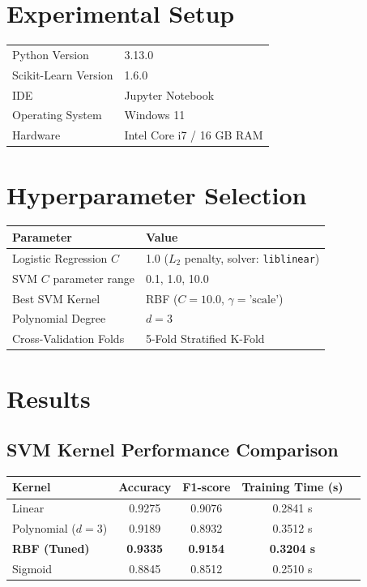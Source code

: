 \documentclass[12pt,a4paper]{article}
\begin{document}
\section{Experimental Setup}

\begin{tabular}{ll}
\toprule
Python Version & 3.13.0 \\
Scikit-Learn Version & 1.6.0 \\
IDE & Jupyter Notebook \\
Operating System & Windows 11 \\
Hardware & Intel Core i7 / 16 GB RAM \\
\bottomrule
\end{tabular}

\section{Hyperparameter Selection}

\begin{tabular}{ll}
\toprule
Parameter & Value\\
\midrule
Logistic Regression $C$ & 1.0 ($L_2$ penalty, solver: \texttt{liblinear}) \\
SVM $C$ parameter range & 0.1, 1.0, 10.0 \\
Best SVM Kernel & RBF ($C = 10.0$, $\gamma = \text{'scale'}$) \\
Polynomial Degree & $d = 3$ \\
Cross-Validation Folds & 5-Fold Stratified K-Fold \\
\bottomrule
\end{tabular}

\section{Results}

\subsection*{SVM Kernel Performance Comparison}
\begin{tabular}{lcccc}
\toprule
Kernel & Accuracy & F1-score & Training Time (s) \\
\midrule
Linear & 0.9275 & 0.9076 & 0.2841 s \\
Polynomial ($d=3$) & 0.9189 & 0.8932 & 0.3512 s \\
\textbf{RBF (Tuned)} & \textbf{0.9335} & \textbf{0.9154} & \textbf{0.3204 s} \\
Sigmoid & 0.8845 & 0.8512 & 0.2510 s \\
\bottomrule
\end{tabular}
\end{document}
